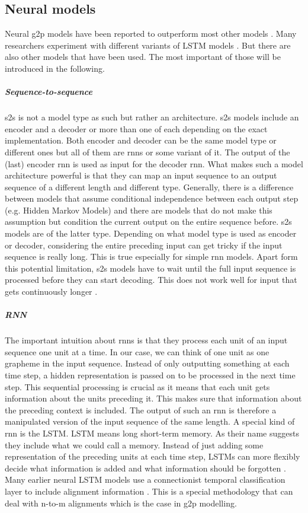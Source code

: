 \subsection{Neural models}
Neural \ac{g2p} models have been reported to outperform most other models \citep{Lee&Ashby.2020}. Many researchers experiment with different variants of LSTM models \citep{Lee&Ashby.2020, hammond-2021-data, gautam.2021, Rao2015GraphemetophonemeCU}. But there are also other models that have been used. The most important of those will be introduced in the following.

\subparagraph{Sequence-to-sequence}
\ac{s2s} is not a model type as such but rather an architecture. \ac{s2s} models include an encoder and a decoder or more than one of each depending on the exact implementation. Both encoder and decoder can be the same model type or different ones but all of them are \acp{rnn} or some variant of it. The output of the (last) encoder \ac{rnn} is used as input for the decoder \ac{rnn}. What makes such a model architecture powerful is that they can map an input sequence to an output sequence of a different length and different type. 
Generally, there is a difference between models that assume conditional independence between each output step (e.g. Hidden Markov Models) and there are models that do not make this assumption but condition the current output on the entire sequence before. \ac{s2s} models are of the latter type. Depending on what model type is used as encoder or decoder, considering the entire preceding input can get tricky if the input sequence is really long. This is true especially for simple \ac{rnn} models. Apart form this potential limitation, \ac{s2s} models have to wait until the full input sequence is processed before they can start decoding. This does not work well for input that gets continuously longer \citep{Kostadinov.2019, DBLP:journals/corr/SutskeverVL14}. 

\subparagraph{RNN}
The important intuition about \acp{rnn} is that they process each unit of an input sequence one unit at a time. In our case, we can think of one unit as one grapheme in the input sequence. Instead of only outputting something at each time step, a hidden representation is passed on to be processed in the next time step. This sequential processing is crucial as it means that each unit gets information about the units preceding it. This makes sure that information about the preceding context is included. The output of such an \ac{rnn} is therefore a manipulated version of the input sequence of the same length.
A special kind of \ac{rnn} is the LSTM. LSTM means long short-term memory. As their name suggests they include what we could call a memory. Instead of just adding some representation of the preceding units at each time step, LSTMs can more flexibly decide what information is added and what information should be forgotten \citep{Olah.29.01.2022, Kostadinov.2017}.
Many earlier neural LSTM models use a connectionist temporal classification layer to include alignment information \citep{lo-nicolai-2021-linguistic}. This is a special methodology that can deal with n-to-m alignments which is the case in \ac{g2p} modelling.

